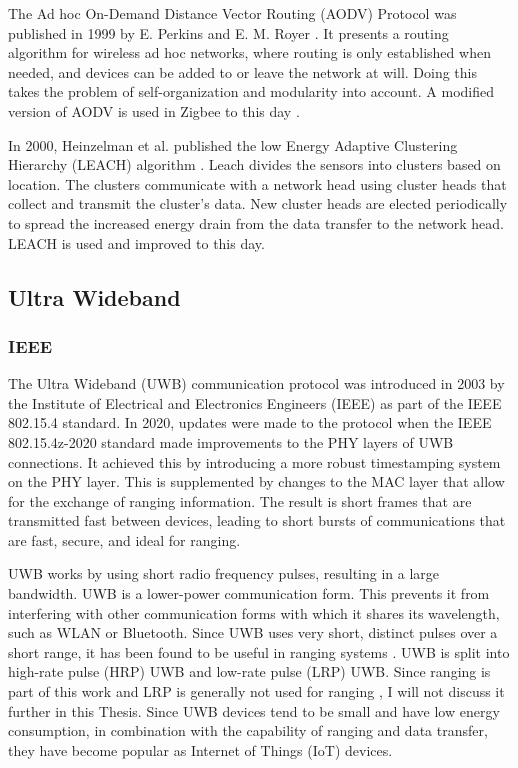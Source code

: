 The Ad hoc On-Demand Distance Vector Routing (AODV) Protocol was published in 1999 by E. Perkins and E. M. Royer \cite{royer1999multicast}.
It presents a routing algorithm for wireless ad hoc networks, where routing is only established when needed, and devices can be added to or leave the network at will.
Doing this takes the problem of self-organization and modularity into account.
A modified version of AODV is used in Zigbee to this day \cite{mu2017improved}. 

In 2000, Heinzelman et al. published the low Energy Adaptive Clustering Hierarchy (LEACH) algorithm \cite{heinzelman2000energy}.
Leach divides the sensors into clusters based on location.
The clusters communicate with a network head using cluster heads that collect and transmit the cluster's data.
New cluster heads are elected periodically to spread the increased energy drain from the data transfer to the network head.
LEACH is used \cite{sefati2022cluster, ghazy2023low} and improved \cite{bagherzadeh2022survey} to this day.

\subsection{Ultra Wideband}

\subsubsection{IEEE}

The Ultra Wideband (UWB) communication protocol was introduced in 2003 by the Institute of Electrical and Electronics Engineers (IEEE) as part of the IEEE 802.15.4 standard.
In 2020, updates were made to the protocol when the IEEE 802.15.4z-2020 standard made improvements to the PHY layers of UWB connections. 
It achieved this by introducing a more robust timestamping system on the PHY layer.
This is supplemented by changes to the MAC layer that allow for the exchange of ranging information.
The result is short frames that are transmitted fast between devices, leading to short bursts of communications that are fast, secure, and ideal for ranging.


UWB works by using short radio frequency pulses, resulting in a large bandwidth.
UWB is a lower-power communication form.
This prevents it from interfering with other communication forms with which it shares its wavelength, such as WLAN or Bluetooth. 
Since UWB uses very short, distinct pulses over a short range, it has been found to be useful in ranging systems \cite{hsu_2021}. 
UWB is split into high-rate pulse (HRP) UWB and low-rate pulse (LRP) UWB.
Since ranging is part of this work and LRP is generally not used for ranging \cite{hsu_2021}, I will not discuss it further in this Thesis.
Since UWB devices tend to be small and have low energy consumption, in combination with the capability of ranging and data transfer, they have become popular as Internet of Things (IoT) devices. \\ 

